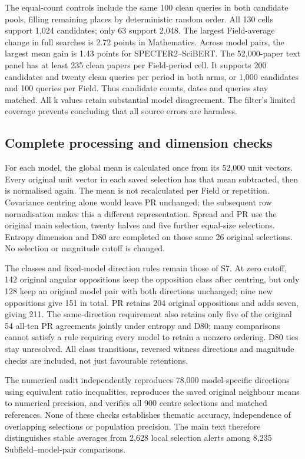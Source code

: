 \documentclass[12pt]{article}
\begin{document}
The equal-count controls include the same 100 clean queries in both candidate pools, filling remaining places by deterministic random order. All 130 cells support 1,024 candidates; only 63 support 2,048. The largest Field-average change in full searches is 2.72 points in Mathematics. Across model pairs, the largest mean gain is 1.43 points for SPECTER2--SciBERT. The 52,000-paper text panel has at least 235 clean papers per Field-period cell. It supports 200 candidates and twenty clean queries per period in both arms, or 1,000 candidates and 100 queries per Field. Thus candidate counts, dates and queries stay matched. All k values retain substantial model disagreement. The filter's limited coverage prevents concluding that all source errors are harmless.

\FloatBarrier

\subsection{Complete processing and dimension checks}
For each model, the global mean is calculated once from its 52,000 unit vectors. Every original unit vector in each saved selection has that mean subtracted, then is normalised again. The mean is not recalculated per Field or repetition. Covariance centring alone would leave PR unchanged; the subsequent row normalisation makes this a different representation. Spread and PR use the original main selection, twenty halves and five further equal-size selections. Entropy dimension and D80 are completed on those same 26 original selections. No selection or magnitude cutoff is changed.

The classes and fixed-model direction rules remain those of S7. At zero cutoff, 142 original angular oppositions keep the opposition class after centring, but only 128 keep an original model pair with both directions unchanged; nine new oppositions give 151 in total. PR retains 204 original oppositions and adds seven, giving 211. The same-direction requirement also retains only five of the original 54 all-ten PR agreements jointly under entropy and D80; many comparisons cannot satisfy a rule requiring every model to retain a nonzero ordering. D80 ties stay unresolved. All class transitions, reversed witness directions and magnitude checks are included, not just favourable retentions.

\FloatBarrier

The numerical audit independently reproduces 78,000 model-specific directions using equivalent ratio inequalities, reproduces the saved original neighbour means to numerical precision, and verifies all 900 centre selections and matched references. None of these checks establishes thematic accuracy, independence of overlapping selections or population precision. The main text therefore distinguishes stable averages from 2,628 local selection alerts among 8,235 Subfield--model-pair comparisons.

\FloatBarrier


\end{document}
